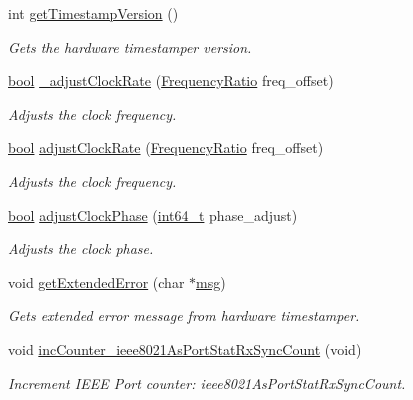 \begin{DoxyCompactItemize}
int \hyperlink{class_common_port_a37b73927973c0156148f290f57141db9}{get\+Timestamp\+Version} ()
\begin{DoxyCompactList}\small\item\em Gets the hardware timestamper version. \end{DoxyCompactList}\item 
\hyperlink{avb__gptp_8h_af6a258d8f3ee5206d682d799316314b1}{bool} \hyperlink{class_common_port_a3e1572a1780c20a1dabaa7fe63982a9f}{\+\_\+adjust\+Clock\+Rate} (\hyperlink{ptptypes_8hpp_a84de47dc2ed889ecd2b61706d3ad0f2e}{Frequency\+Ratio} freq\+\_\+offset)
\begin{DoxyCompactList}\small\item\em Adjusts the clock frequency. \end{DoxyCompactList}\item 
\hyperlink{avb__gptp_8h_af6a258d8f3ee5206d682d799316314b1}{bool} \hyperlink{class_common_port_ae170579ddceaecf5aadccb4a34f86d63}{adjust\+Clock\+Rate} (\hyperlink{ptptypes_8hpp_a84de47dc2ed889ecd2b61706d3ad0f2e}{Frequency\+Ratio} freq\+\_\+offset)
\begin{DoxyCompactList}\small\item\em Adjusts the clock frequency. \end{DoxyCompactList}\item 
\hyperlink{avb__gptp_8h_af6a258d8f3ee5206d682d799316314b1}{bool} \hyperlink{class_common_port_a02450dd64ba11f034faefad018d15a63}{adjust\+Clock\+Phase} (\hyperlink{parse_8c_a67a9885ef4908cb72ce26d75b694386c}{int64\+\_\+t} phase\+\_\+adjust)
\begin{DoxyCompactList}\small\item\em Adjusts the clock phase. \end{DoxyCompactList}\item 
void \hyperlink{class_common_port_a8bcdf3d304abf916ea33264ef3e5af39}{get\+Extended\+Error} (char $\ast$\hyperlink{openavb__log_8c_a0c7e58a50354c4a4d6dad428d0e47029}{msg})
\begin{DoxyCompactList}\small\item\em Gets extended error message from hardware timestamper. \end{DoxyCompactList}\item 
void \hyperlink{class_common_port_a82bc733c03001e7714cd1226ff4cbfda}{inc\+Counter\+\_\+ieee8021\+As\+Port\+Stat\+Rx\+Sync\+Count} (void)
\begin{DoxyCompactList}\small\item\em Increment I\+E\+EE Port counter\+: ieee8021\+As\+Port\+Stat\+Rx\+Sync\+Count. \end{DoxyCompactList}\item 

\end{DoxyCompactItemize}
